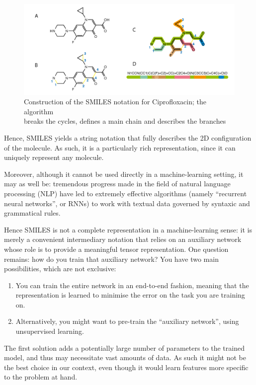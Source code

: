 \documentclass[11pt]{article}
\numberwithin{equation}{subsection}
\begin{document}
\begin{figure}[ht]
  \includegraphics[width=.7\textwidth,center]{representation/SMILES}
  \caption{Construction of the SMILES notation for Ciprofloxacin; the algorithm \\breaks the cycles, defines a main chain and describes the branches \citep{wiki:smiles}}
  \label{fig:smiles}
\end{figure}

Hence, SMILES yields a string notation that fully describes the 2D configuration of the molecule. As such, it is a particularly rich representation, since it can uniquely represent any molecule.

Moreover, although it cannot be used directly in a machine-learning setting, it may as well be: tremendous progress made in the field of natural language processing (NLP) have led to extremely effective algorithms (namely ``recurrent neural networks'', or RNNs) to work with textual data governed by syntaxic and grammatical rules.

Hence SMILES is not a complete representation in a machine-learning sense: it is merely a convenient intermediary notation that relies on an auxiliary network whose role is to provide a meaningful tensor representation. One question remains: how do you train that auxiliary network? You have two main possibilities, which are not exclusive:
\begin{enumerate}
  \item You can train the entire network in an end-to-end fashion, meaning that the representation is learned to minimise the error on the task you are training on.

  \item Alternatively, you might want to pre-train the ``auxiliary network'', using unsupervised learning.
\end{enumerate}

The first solution adds a potentially large number of parameters to the trained model, and thus may necessitate vast amounts of data. As such it might not be the best choice in our context, even though it would learn features more specific to the problem at hand.
\end{document}
